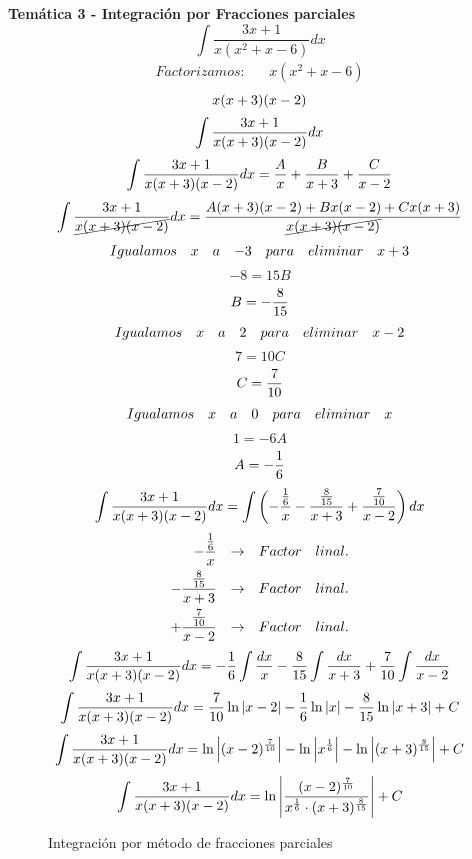 






\textbf{Temática 3 - Integración por Fracciones parciales}
\[\int\frac{3x+1}{x(x^2+x-6)}dx\]
\[
    \begin{aligned}
        Factorizamos: && x(x^2+x-6)
    \end{aligned}
\]
\[\drwdenominator{0}\]
\[\fracexpretion{0}\]
\[\fracexpretion{0}=\frac{A}{\fexpression}+\frac{B}{\sexpression}+\frac{C}{\texpression}\]
\[\fracexpretion{1}=\frac{A(\sexpression)(\texpression)+B\fexpression(\texpression)+C\fexpression(\sexpression)}{\drwdenominator{1}}\]
\[
    \begin{aligned}
        Igualamos && x && a && -3 && para && eliminar && x+3
    \end{aligned}
\]
\[-8=15B\]
\[B=\fracb{1}\]
\[
    \begin{aligned}
        Igualamos && x && a && 2 && para && eliminar && x-2
    \end{aligned}
\]
\[7=10C\]
\[C=\frac{7}{10}\]
\[
    \begin{aligned}
        Igualamos && x && a && 0 && para && eliminar && x
    \end{aligned}
\]
\[1=-6A\]
\[A=\fraca{1}\]
\[\fracexpretion{0}=\int\left(\drawffraction\drawsfraction\drawtfraction\right)dx\]
\[
    \begin{aligned}
       \drawffraction && \rightarrow && Factor && linal. \\
       \drawsfraction && \rightarrow && Factor && linal. \\
       \drawtfraction && \rightarrow && Factor && linal.
    \end{aligned}
\]
\[\fracexpretion{0}=\fraca{1}\int\frac{dx}{\fexpression}\fracb{1}\int\frac{dx}{\sexpression}+\fracc\int\frac{dx}{\texpression}\]
\[\fracexpretion{0}=\fracc\ln\left|\texpression\right|\fraca{1}\ln\left|\fexpression\right|\fracb{1}\ln\left|\sexpression\right|+C\]
\[\fracexpretion{0}=\ln\left|\drawtexpression\right|-\ln\left|\drawfexpression\right|-\ln\left|\drawsexpression\right|+C\]
\[\fracexpretion{0}=\ln\left|\frac{\drawtexpression}{\drawfexpression\cdot\drawsexpression}\right|+C\]

\begin{figure}[h]
    \begin{center}
        \caption{Integración por método de fracciones parciales}
    \end{center}
\end{figure}